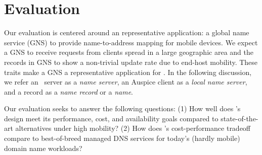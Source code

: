 \section{Evaluation}
\label{sec:eval}



Our evaluation is centered around an representative application: a global name service (GNS) to provide name-to-address mapping for mobile devices. 
We expect a GNS to  receive requests from clients spread in a large geographic area and the records in GNS to show a non-trivial update rate due to end-host mobility. These traits make a GNS a representative application for \auspice. In the following discussion, we refer an \auspice\ server as a \emph{name server}, an Auspice client as a \emph{local name server}, and a record as a \emph{name record} or a \emph{name}.

Our evaluation seeks to answer the following questions: (1) How well does \auspice's design meet its performance, cost, and availability goals compared to state-of-the-art alternatives under high mobility? (2) How does \auspice's cost-performance tradeoff compare to best-of-breed managed DNS services for today's (hardly mobile) domain name workloads?




\vspace{-0.1in}
